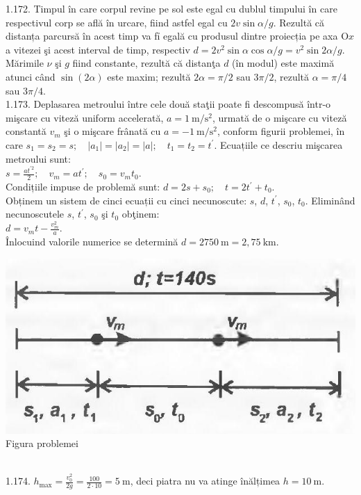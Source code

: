 1.172. Timpul în care corpul revine pe sol este egal cu dublul timpului în care respectivul corp se află în urcare, fiind astfel egal cu $2 v \sin \alpha / g$. Rezultă că distanța parcursă în acest timp va fỉ egală cu produsul dintre proiecția pe axa $\mathrm{O} x$ a vitezei şi acest interval de timp, respectiv $d=2 v^{2} \sin \alpha \cos \alpha / g=v^{2} \sin 2 \alpha / g$. Mărimile $\nu$ şi $g$ fiind constante, rezultă că distanţa $d$ (în modul) este maximă atunci când $\sin (2 \alpha)$ este maxim; rezultă $2 \alpha=\pi / 2$ sau $3 \pi / 2$, rezultă $\alpha=\pi / 4$ sau $3 \pi / 4$.\\

1.173. Deplasarea metroului între cele două staţii poate fi descompusă într-o mişcare cu viteză uniform accelerată, $a=1 \mathrm{~m} / \mathrm{s}^{2}$, urmată de o mişcare cu viteză constantă $v_{m}$ şi o mişcare frânată cu $a=-1 \mathrm{~m} / \mathrm{s}^{2}$, conform figurii problemei, în care $s_{1}=s_{2}=s; \quad \left|a_{1}\right|=\left|a_{2}\right|=|a|; \quad t_{1}=t_{2}=t^{\prime}$. Ecuațiile ce descriu mişcarea metroului sunt:\\ $s=\frac{a t^{\prime 2}}{2}; \quad v_{m}=a t^{\prime}; \quad s_{0}=v_{m} t_{0}$.\\ Condițiile impuse de problemă sunt: $d=2 s+s_{0}; \quad t=2 t^{\prime}+t_{0}$.\\ Obținem un sistem de cinci ecuații cu cinci necunoscute: $s$, $d$, $t^{\prime}$, $s_{0}$, $t_{0}$. Eliminând necunoscutele $s$, $t^{\prime}$, $s_{0}$ şi $t_{0}$ obţinem:\\ $d=v_{m} t-\frac{v_{m}^{2}}{a}$.\\ Înlocuind valorile numerice se determină $d=2750 \mathrm{~m}=2,75 \mathrm{~km}$.\\ \begin{center} \includegraphics[width=0.4\linewidth]{images/2025_07_01_5b3ff9fa0d508c8e9f17g-236}\\ Figura problemei \end{center}\\

1.174. $h_{\max }=\frac{v_{0}^{2}}{2 g}=\frac{100}{2 \cdot 10}=5 \mathrm{~m}$, deci piatra nu va atinge înălțimea $h=10 \mathrm{~m}$.\\

